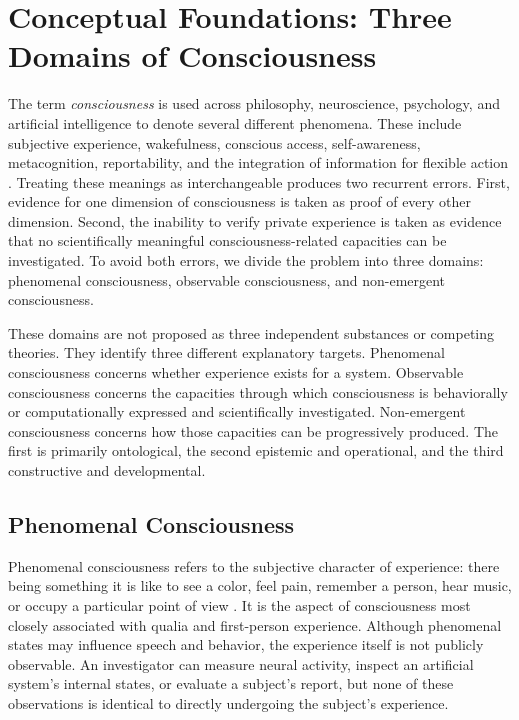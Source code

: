 \section{\textbf{Conceptual Foundations: Three Domains of Consciousness}}
\label{sec:conceptual-foundations}

The term \emph{consciousness} is used across philosophy, neuroscience, psychology, and artificial intelligence to denote several different phenomena. These include subjective experience, wakefulness, conscious access, self-awareness, metacognition, reportability, and the integration of information for flexible action \cite{block1995confusion,seth2022theories}. Treating these meanings as interchangeable produces two recurrent errors. First, evidence for one dimension of consciousness is taken as proof of every other dimension. Second, the inability to verify private experience is taken as evidence that no scientifically meaningful consciousness-related capacities can be investigated. To avoid both errors, we divide the problem into three domains: phenomenal consciousness, observable consciousness, and non-emergent consciousness.

These domains are not proposed as three independent substances or competing theories. They identify three different explanatory targets. Phenomenal consciousness concerns whether experience exists for a system. Observable consciousness concerns the capacities through which consciousness is behaviorally or computationally expressed and scientifically investigated. Non-emergent consciousness concerns how those capacities can be progressively produced. The first is primarily ontological, the second epistemic and operational, and the third constructive and developmental.

\subsection{Phenomenal Consciousness}
\label{subsec:phenomenal-consciousness}

Phenomenal consciousness refers to the subjective character of experience: there being something it is like to see a color, feel pain, remember a person, hear music, or occupy a particular point of view \cite{nagel1974what,chalmers1995facing}. It is the aspect of consciousness most closely associated with qualia and first-person experience. Although phenomenal states may influence speech and behavior, the experience itself is not publicly observable. An investigator can measure neural activity, inspect an artificial system's internal states, or evaluate a subject's report, but none of these observations is identical to directly undergoing the subject's experience.

